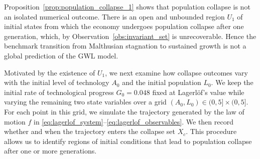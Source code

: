 \documentclass[a4paper,fleqn]{cas-sc}
\begin{document}
Proposition~\ref{prop:population_collapse_1} shows that population collapse is not an isolated numerical outcome. 
There is an open and unbounded region $U_1$ of initial states from which the economy undergoes population collapse after one generation, which, by Observation~\ref{obs:invariant_set} is unrecoverable. 
Hence the benchmark transition from Malthusian stagnation to sustained growth is not a global prediction of the GWL model.

Motivated by the existence of $U_1$, we next examine how collapse outcomes vary with the initial level of technology $A_0$ and the initial population $L_0$.
We keep the initial rate of technological progress $G_0=0.048$ fixed at Lagerl\"of's value while varying the remaining two state variables over a grid \((A_0,L_0)\in(0,5]\times(0,5].\)
For each point in this grid, we simulate the trajectory generated by the law of motion $f$ in \eqref{eq:lagerlof_system}--\eqref{eq:lagerlof_observables}.
We then record whether and when the trajectory enters the collapse set $X_c$. 
This procedure allows us to identify regions of initial conditions that lead to population collapse after one or more generations.
\end{document}
